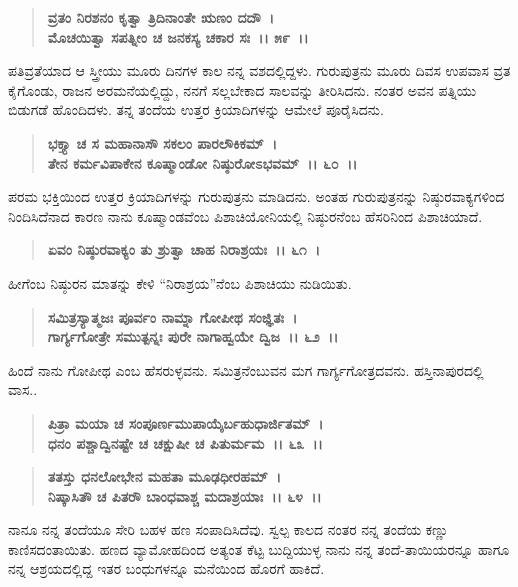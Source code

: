 \begin{verse}
\textbf{ವ್ರತಂ ನಿರಶನಂ ಕೃತ್ವಾ ತ್ರಿದಿನಾಂತೇ ಋಣಂ ದದೌ~।}\\\textbf{ಮೊಚಯಿತ್ವಾ ಸಪತ್ನೀಂ ಚ ಜನಕಸ್ಯ ಚಕಾರ ಸಃ~।। ೫೯~।।}
\end{verse}

ಪತಿವ್ರತೆಯಾದ ಆ ಸ್ತ್ರೀಯು ಮೂರು ದಿನಗಳ ಕಾಲ ನನ್ನ ವಶದಲ್ಲಿದ್ದಳು. ಗುರುಪುತ್ರನು ಮೂರು ದಿವಸ ಉಪವಾಸ ವ್ರತ ಕೈಗೊಂಡು, ರಾಜನ ಅರಮನೆಯಲ್ಲಿದ್ದು, ನನಗೆ ಸಲ್ಲಬೇಕಾದ ಸಾಲವನ್ನು ತೀರಿಸಿದನು. ನಂತರ ಅವನ ಪತ್ನಿಯು ಬಿಡುಗಡೆ ಹೊಂದಿದಳು. ತನ್ನ ತಂದೆಯ ಉತ್ತರ ಕ್ರಿಯಾದಿಗಳನ್ನು ಆಮೇಲೆ ಪೂರೈಸಿದನು.

\begin{verse}
\textbf{ಭಕ್ತ್ಯಾ ಚ ಸ ಮಹಾನಾಸೌ ಸಕಲಂ ಪಾರಲೌಕಿಕಮ್~।}\\\textbf{ತೇನ ಕರ್ಮವಿಪಾಕೇನ ಕೂಷ್ಮಾಂಡೋ ನಿಷ್ಠುರೋಽಭವಮ್~।। ೬೦~।।}
\end{verse}

ಪರಮ ಭಕ್ತಿಯಿಂದ ಉತ್ತರ ಕ್ರಿಯಾದಿಗಳನ್ನು ಗುರುಪುತ್ರನು ಮಾಡಿದನು. ಅಂತಹ ಗುರುಪುತ್ರನನ್ನು ನಿಷ್ಠುರವಾಕ್ಯಗಳಿಂದ ನಿಂದಿಸಿದೆನಾದ ಕಾರಣ ನಾನು ಕೂಷ್ಮಾಂಡವೆಂಬ ಪಿಶಾಚಿಯೋನಿಯಲ್ಲಿ ನಿಷ್ಠುರನೆಂಬ ಹೆಸರಿನಿಂದ ಪಿಶಾಚಿಯಾದೆ.

\begin{verse}
\textbf{ಏವಂ ನಿಷ್ಠುರವಾಕ್ಯಂ ತು ಶ್ರುತ್ವಾ ಚಾಹ ನಿರಾಶ್ರಯಃ~।। ೬೧~।}
\end{verse}

ಹೀಗೆಂಬ ನಿಷ್ಠುರನ ಮಾತನ್ನು ಕೇಳಿ “ನಿರಾಶ್ರಯ”ನೆಂಬ ಪಿಶಾಚಿಯು ನುಡಿಯಿತು.

\begin{verse}
\textbf{ಸಮಿತ್ರಸ್ಯಾತ್ಮಜಃ ಪೂರ್ವಂ ನಾಮ್ನಾ ಗೋಪೀಥ ಸಂಜ್ಞಿತಃ~।}\\\textbf{ಗಾರ್ಗ್ಯಗೋತ್ರೇ ಸಮುತ್ಪನ್ನಃ ಪುರೇ ನಾಗಾಹ್ವಯೇ ದ್ವಿಜ~।। ೬೨~।।}
\end{verse}

ಹಿಂದೆ ನಾನು ಗೋಪೀಥ ಎಂಬ ಹೆಸರುಳ್ಳವನು. ಸಮಿತ್ರನೆಂಬುವನ ಮಗ ಗಾರ್ಗ್ಯಗೋತ್ರದವನು. ಹಸ್ತಿನಾಪುರದಲ್ಲಿ ವಾಸ..

\begin{verse}
\textbf{ಪಿತ್ರಾ ಮಯಾ ಚ ಸಂಪೂರ್ಣಮುಪಾಯೈರ್ಬಹುಧಾರ್ಜಿತಮ್~।}\\\textbf{ಧನಂ ಪಶ್ಚಾದ್ವಿನಷ್ಟೇ ಚ ಚಕ್ಷುಷೀ ಚ ಪಿತುರ್ಮಮ~।। ೬೩~।।}
\end{verse}

\begin{verse}
\textbf{ತತಸ್ತು ಧನಲೋಭೇನ ಮಹತಾ ಮೂಢಧೀರಹಮ್~।}\\\textbf{ನಿಷ್ಕಾಸಿತೌ ಚ ಪಿತರೌ‌ ಬಾಂಧವಾಶ್ಚ ಮದಾಶ್ರಯಾಃ~।। ೬೪~।।}
\end{verse}

ನಾನೂ ನನ್ನ ತಂದೆಯೂ ಸೇರಿ ಬಹಳ ಹಣ ಸಂಪಾದಿಸಿದೆವು. ಸ್ವಲ್ಪ ಕಾಲದ ನಂತರ ನನ್ನ ತಂದೆಯ ಕಣ್ಣು ಕಾಣಿಸದಂತಾಯಿತು. ಹಣದ ವ್ಯಾಮೋಹದಿಂದ ಅತ್ಯಂತ ಕೆಟ್ಟ ಬುದ್ದಿಯುಳ್ಳ ನಾನು ನನ್ನ ತಂದೆ-ತಾಯಿಯರನ್ನೂ ಹಾಗೂ ನನ್ನ ಆಶ್ರಯದಲ್ಲಿದ್ದ ಇತರ ಬಂಧುಗಳನ್ನೂ ಮನೆಯಿಂದ ಹೊರಗೆ ಹಾಕಿದೆ.

